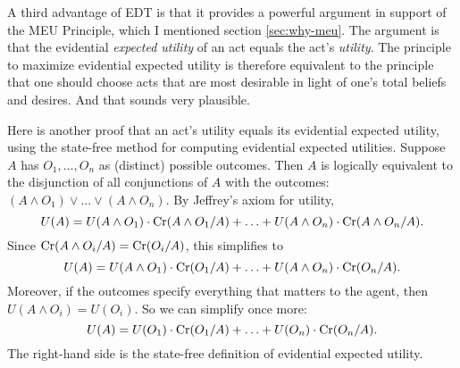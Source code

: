 
A third advantage of EDT is that it provides a powerful argument in
support of the MEU Principle, which I mentioned section
\ref{sec:why-meu}. The argument is that the evidential \emph{expected
  utility} of an act equals the act's \emph{utility}. The principle to
maximize evidential expected utility is therefore equivalent to the
principle that one should choose acts that are most desirable in light
of one's total beliefs and desires. And that sounds very plausible.

Here is another proof that an act's utility equals its evidential
expected utility, using the state-free method for computing evidential
expected utilities. Suppose $A$ has $O_1,\ldots, O_n$ as (distinct)
possible outcomes. Then $A$ is logically equivalent to the disjunction
of all conjunctions of $A$ with the outcomes:
$(A \land O_1) \lor \ldots \lor (A \land O_n)$.
By Jeffrey's axiom for utility,
\[
U(A) = U(A\land O_1) \cdot \text{Cr}(A \land O_1/A) + \ldots +
       U(A\land O_n) \cdot \text{Cr}(A \land O_n/A).
\]
Since $\text{Cr}(A \land O_i/A) = \text{Cr}(O_i/A)$, this simplifies to
\[
U(A) = U(A\land O_1) \cdot \text{Cr}(O_1/A) + \ldots +
       U(A\land O_n) \cdot \text{Cr}(O_n/A).
\]
Moreover, if the outcomes specify everything that matters to the
agent, then $U(A \land O_i) = U(O_i)$. So we can simplify once more:
\[
U(A) = U(O_1) \cdot \text{Cr}(O_1/A) + \ldots + U(O_n) \cdot \text{Cr}(O_n/A).
\]
The right-hand side is the state-free definition of evidential expected utility.

